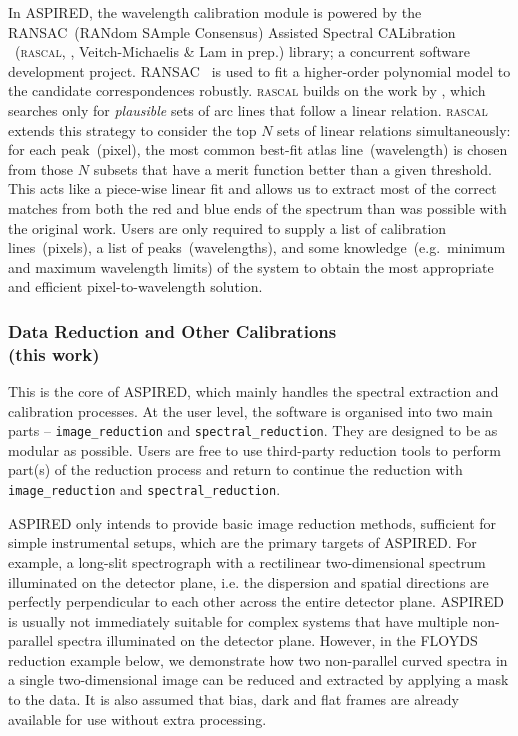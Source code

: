 \documentclass[linenumbers, twocolumn]{aastex631}
\begin{document}
In \textsc{ASPIRED}, the wavelength calibration module is powered by the
RANSAC~(RANdom SAmple Consensus) Assisted Spectral CALibration ~(\textsc{rascal},
\citealt{2020zndo...4117517V, 2020ASPC..527..627V}, Veitch-Michaelis \& Lam in prep.)
library; a concurrent software development project.
RANSAC~\citep{fischler_bolles_1981} is used to fit a higher-order polynomial
model to the candidate correspondences robustly. \textsc{rascal} builds on the
work by \citet{2018ApOpt..57.6876S}, which searches only for \textit{plausible}
sets of arc lines that follow a linear relation. \textsc{rascal} extends this strategy to
consider the top $N$ sets of linear relations simultaneously: for each
peak~(pixel), the most common best-fit atlas line~(wavelength) is chosen from
those $N$ subsets that have a merit function better than a given threshold.
This acts like a piece-wise linear fit and allows us to extract most of the
correct matches from both the red and blue ends of the spectrum than was possible with the
original work. Users are only required to supply a list of calibration
lines~(pixels), a list of peaks~(wavelengths), and some knowledge~(e.g.\ minimum
and maximum wavelength limits) of the system to obtain the most appropriate
and efficient pixel-to-wavelength solution.

\subsubsection*{Data Reduction and Other Calibrations\\(this work)}
This is the core of \textsc{ASPIRED}, which mainly handles the spectral
extraction and calibration processes. At the user level, the software is
organised into two main parts -- \texttt{image\_reduction} and
\texttt{spectral\_reduction}. They are designed to be as modular as possible.
Users are free to use third-party reduction tools to perform part(s) of 
the reduction process and return to continue the reduction with
\texttt{image\_reduction} and \texttt{spectral\_reduction}.

\textsc{ASPIRED} only intends to provide basic image reduction methods,
sufficient for simple instrumental setups, which are the primary targets of
\textsc{ASPIRED}. For example, a long-slit spectrograph with a rectilinear
two-dimensional spectrum illuminated on the detector plane, i.e. the dispersion
and spatial directions are perfectly perpendicular to each other across the
entire detector plane. \textsc{ASPIRED} is usually not
immediately suitable for complex systems that have multiple non-parallel
spectra illuminated on the detector plane. However, in the FLOYDS reduction example below,
we demonstrate how two non-parallel curved spectra in a single two-dimensional
image can be reduced and extracted by applying a mask to the data. It is also assumed that bias, dark and flat frames
are already available for use without extra processing.
\end{document}
